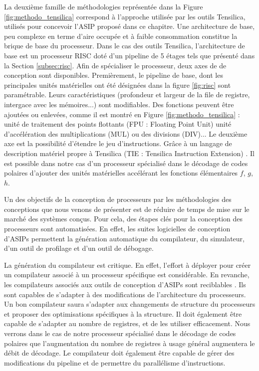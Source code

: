 La deuxième famille de méthodologies représentée dans la Figure \ref{fig:methodo_tensilica} correspond à l'approche utilisée par les outils Tensilica, utilisés pour concevoir l'ASIP proposé dans ce chapitre. Une architecture de base, peu complexe en terme d'aire occupée et à faible consommation constitue la brique de base du processeur. Dans le cas des outils Tensilica, l'architecture de base est un processeur RISC doté d'un pipeline de 5 étages tels que présenté dans la Section \ref{subsec:risc}. Afin de spécialiser le processeur, deux axes de de conception sont disponibles. Premièrement, le pipeline de base, dont les principales unités matérielles ont été désignées dans la figure \ref{fig:risc} sont paramétrable. Leurs caractéristiques (profondeur et largeur de la file de registre, intergace avec les mémoires...) sont modifiables. Des fonctions peuvent être ajoutées ou enlevées, comme il est montré en Figure \ref{fig:methodo_tensilica} : unité de traitement des points flottants (FPU : Floating Point Unit) unité d'accélération des multiplications (MUL) ou des divisions (DIV)... Le deuxième axe est la possibilité d'étendre le jeu d'instructions. Grâce à un langage de description matériel propre à Tensilica (TIE : Tensilica Instruction Extension) \cite{tie2017reference}. Il est possible dans notre cas d'un processeur spécialisé dans le décodage de codes polaires d'ajouter des unités matérielles accélérant les fonctions élémentaires $f$, $g$, $h$.

Un des objectifs de la conception de processeurs par les méthodologies des conceptions que nous venons de présenter est de réduire de temps de mise sur le marché des systèmes conçus. Pour cela, des étapes clés pour la conception des processeurs sont automatisées. En effet, les suites logicielles de conception d'ASIPs permettent la génération automatique du compilateur, du simulateur, d'un outil de profilage et d'un outil de débogage. 

La génération du compilateur est critique. En effet, l'effort à déployer pour créer un compilateur associé à un processeur spécifique est considérable. En revanche, les compilateurs associés aux outils de conception d'ASIPs sont \og reciblables \fg. Ils sont capables de s'adapter à des modifications de l'architecture du processeurs. Un bon compilateur saura s'adapter aux changements de structure du processeurs et proposer des optimisations spécifiques à la structure. Il doit également être capable de s'adapter au nombre de registres, et de les utiliser efficacement. Nous verrons dans le cas de notre processeur spécialisé dans le décodage de codes polaires que l'augmentation du nombre de registres à usage général augmentera le débit de décodage. Le compilateur doit également être capable de gérer des modifications du pipeline et de permettre du parallélisme d'instructions.

